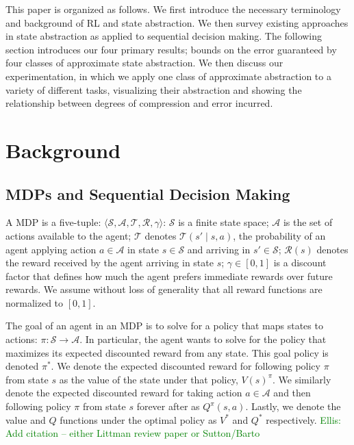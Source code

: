\documentclass{article}
\newcommand\enote[1]{\textcolor{green}{Ellis: #1}}
\begin{document}
This paper is organized as follows. We first introduce the necessary terminology and background of \ac{RL} and state abstraction. We then survey existing approaches in state abstraction as applied to sequential decision making. The following section introduces our four primary results; bounds on the error guaranteed by four classes of approximate state abstraction. We then discuss our experimentation, in which we apply one class of approximate abstraction to a variety of different tasks, visualizing their abstraction and showing the relationship between degrees of compression and error incurred.


\section{Background}

\subsection{\acp{MDP} and Sequential Decision Making}
A \ac{MDP} is a five-tuple: $\langle \mathcal{S}, \mathcal{A}, \mathcal{T}, \mathcal{R}, \gamma \rangle$: $\mathcal{S}$ is a finite state space; $\mathcal{A}$ is the set of actions available to the agent; $\mathcal{T}$ denotes $\mathcal{T}(s' \mid s,a)$, the probability of an agent applying action $a \in \mathcal{A}$ in state $s \in \mathcal{S}$ and arriving in $s' \in \mathcal{S}$; $\mathcal{R}(s)$ denotes the reward received by the agent arriving in state $s$; $\gamma \in [0, 1]$ is a discount  factor that defines how much the agent prefers immediate rewards over future rewards. We assume without loss of generality that all reward functions are normalized to $[0,1]$.

The goal of an agent in an \ac{MDP} is to solve for a policy that maps states to actions: $\pi: \mathcal{S} \rightarrow \mathcal{A}$. In particular, the agent wants to solve for the policy that maximizes its expected discounted reward from any state. This goal policy is denoted $\pi^*$. We denote the expected discounted reward for following policy $\pi$ from state $s$ as the value of the state under that policy, $V(s)^\pi$. We similarly denote the expected discounted reward for taking action $a \in \mathcal{A}$ and then following policy $\pi$ from state $s$ forever after as $Q^\pi(s,a)$. Lastly, we denote the value and $Q$ functions under the optimal policy as $V^*$ and $Q^*$ respectively. \enote{Add citation -- either Littman review paper or Sutton/Barto}
\end{document}
